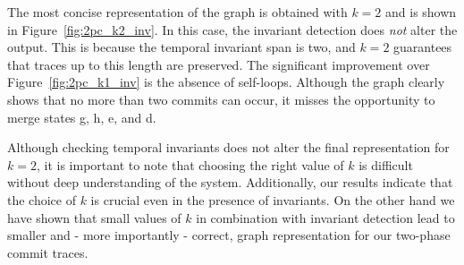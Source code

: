 The most concise representation of the graph is obtained with $k=2$
and is shown in Figure~\ref{fig:2pc_k2_inv}. In this case, the
invariant detection does \emph{not} alter the output. This is because
the temporal invariant span is two, and $k=2$ guarantees that traces
up to this length are preserved. The significant improvement over
Figure~\ref{fig:2pc_k1_inv} is the absence of self-loops. Although the
graph clearly shows that no more than two commits can occur, it misses
the opportunity to merge states g, h, e, and d.

Although checking temporal invariants does not alter the final
representation for $k=2$, it is important to note that choosing the
right value of $k$ is difficult without deep understanding of the
system. Additionally, our results indicate that the choice of $k$ is
crucial even in the presence of invariants. On the other hand we have
shown that small values of $k$ in combination with invariant detection
lead to smaller and - more importantly - correct, graph representation
for our two-phase commit traces.








